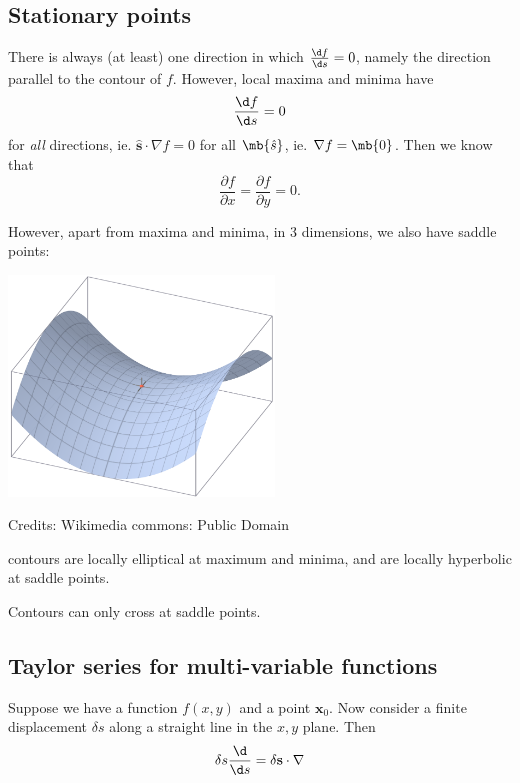 \documentclass[a4paper]{article}
\begin{document}
  \subsection{Stationary points}
  There is always (at least) one direction in which $\frac{\d f}{\d s} = 0$, namely the direction parallel to the contour of $f$. However, local maxima and minima have 
  \[
    \frac{\d f}{\d s} = 0
  \]
  for \emph{all} directions, ie. $\mathbf{\hat{s}}\cdot \nabla f = 0$ for all $\mb{\hat{s}}$, ie. $\nabla f = \mb{0}$. Then we know that
  \[
    \frac{\partial f}{\partial x} = \frac{\partial f}{\partial y} = 0.
  \]
  \pagebreak %

  However, apart from maxima and minima, in 3 dimensions, we also have saddle points:

  \begin{center}
    \includegraphics[width=200pt]{images/de_22.png}

    Credits: Wikimedia commons: Public Domain
  \end{center}

  \note contours are locally elliptical at maximum and minima, and are locally hyperbolic at saddle points.

  \note Contours can only cross at saddle points.
  \subsection{Taylor series for multi-variable functions}
  Suppose we have a function $f(x, y)$ and a point $\mathbf{x}_0$. Now consider a finite displacement $\delta s$ along a straight line in the $x,y$ plane. Then
  \[
    \delta s\frac{\d }{\d s} = \delta \mathbf{s}\cdot \nabla
  \]
\end{document}
